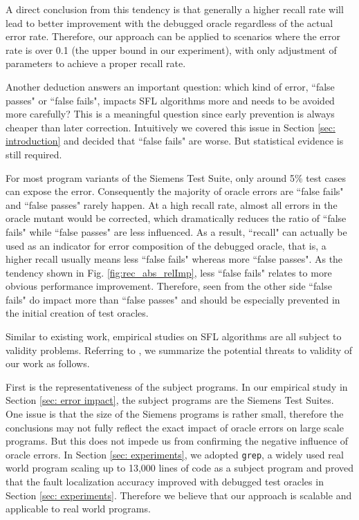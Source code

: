 A direct conclusion from this tendency is that generally a higher recall rate will lead to better improvement with the debugged oracle regardless of the actual error rate. Therefore, our approach can be applied to scenarios where the error rate is over 0.1 (the upper bound in our experiment), with only adjustment of parameters to achieve a proper recall rate.

Another deduction answers an important question: which kind of error, ``false passes" or ``false fails", impacts SFL algorithms more and needs to be avoided more carefully? This is a meaningful question since early prevention is always cheaper than later correction. Intuitively we covered this issue in Section \ref{sec: introduction} and decided that ``false fails" are worse. But statistical evidence is still required.

For most program variants of the Siemens Test Suite, only around 5\% test cases can expose the error. Consequently the majority of oracle errors are ``false fails" and ``false passes" rarely happen. At a high recall rate, almost all errors in the oracle mutant would be corrected, which dramatically reduces the ratio of ``false fails" while ``false passes" are less influenced. As a result, ``recall" can actually be used as an indicator for error composition of the debugged oracle, that is, a higher recall usually means less ``false fails" whereas more ``false passes". As the tendency shown in Fig. \ref{fig:rec_abs_relImp}, less ``false fails" relates to more obvious performance improvement. Therefore, seen from the other side ``false fails" do impact more than ``false passes" and should be especially prevented in the initial creation of test oracles.




Similar to existing work, empirical studies on SFL algorithms are all subject to validity problems. Referring to \cite{Steimann:2013:TVV:2483760.2483767}, we summarize the potential threats to validity of our work as follows.

First is the representativeness of the subject programs. In our empirical study in Section \ref{sec: error impact}, the subject programs are the Siemens Test Suites. One issue is that the size of the Siemens programs is rather small, therefore the conclusions may not fully reflect the exact impact of oracle errors on large scale programs. But this does not impede us from confirming the negative influence of oracle errors. In Section \ref{sec: experiments}, we adopted \texttt{grep}, a widely used real world program scaling up to 13,000 lines of code as a subject program and proved that the fault localization accuracy improved with debugged test oracles in Section \ref{sec: experiments}. Therefore we believe that our approach is scalable and applicable to real world programs.

